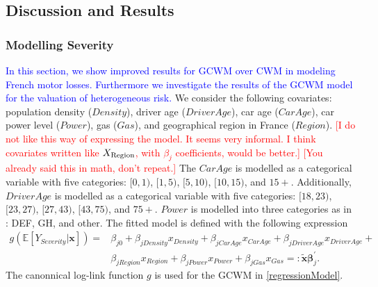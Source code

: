 \documentclass[11pt,letterpaper]{article}
\numberwithin{equation}{section}
\numberwithin{equation}{section}
\numberwithin{equation}{section}
\newcommand{\xTilda}{\tilde{\bm{x}}}
\begin{document}
\subsection{Discussion and Results}
\subsubsection{Modelling Severity}
\textcolor{blue}{In this section, we show improved results for GCWM  over CWM in modeling French motor losses. Furthermore we investigate the results of the GCWM model for the valuation of heterogeneous risk.} We consider the following covariates: population density ($Density$), driver age ($DriverAge$), car age ($CarAge$), car power level ($Power$), gas ($Gas$),  and geographical region in France ($Region$). %
\textcolor{red}{[I do not like this way of expressing the model. It seems very informal. I think covariates written like $X_{\tiny \text{Region}}$, with $\beta_j$ coefficients, would be better.]}
 \textcolor{red}{[You already said this in math, don't repeat.]} 
The
$CarAge$ is modelled as a categorical variable with five categories: $[0,1)$, $[1,5)$, $[5,10)$, $[10,15)$, and $15+$. Additionally, $DriverAge$ is modelled as a categorical variable with five categories: $[18,23)$, $[23,27)$, $[27,43)$, $[43,75)$, and $75+$. $Power$ is modelled into three categories as in \cite{Charpentier:2014}:
DEF, GH, and other. The fitted model is defined with the following expression
\begin{align}
g(\mathbb{E}\left[Y_{Severity}|\bm{x}\right]) = 
 & \beta_{j0} +  \beta_{jDensity}x_{Density}+ \beta_{jCar Age} x_{Car Age}+ \beta_{jDriver Age} x_{Driver Age} + \nonumber \\ &  \beta_{jRegion} x_{Region} + \beta_{jPower} x_{Power} + \beta_{jGas} x_{Gas} \label{regressionModel}  =: \bm{\xTilda} \bm{\beta}_j^{'}.
\end{align}
The canonnical log-link function $g$ is used for the GCWM in \eqref{regressionModel}. 
\end{document}

